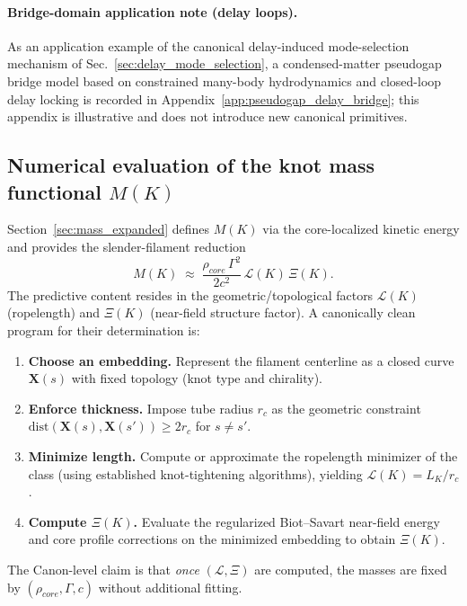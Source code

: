 \documentclass[10pt]{article}
\newcommand{\rhocore}{\rho_{core}}
\begin{document}
\paragraph{Bridge-domain application note (delay loops).}
As an application example of the canonical delay-induced mode-selection mechanism of Sec.~\ref{sec:delay_mode_selection},
a condensed-matter pseudogap bridge model based on constrained many-body hydrodynamics and closed-loop delay locking is recorded in Appendix~\ref{app:pseudogap_delay_bridge};
this appendix is illustrative and does not introduce new canonical primitives.

\subsection{Numerical evaluation of the knot mass functional $M(K)$}
\label{sec:mass_numerics_program}

Section~\ref{sec:mass_expanded} defines $M(K)$ via the core-localized kinetic energy
and provides the slender-filament reduction
\begin{equation}
M(K)\;\approx\;\frac{\rhocore\,\Gamma^2}{2c^2}\,\mathcal{L}(K)\,\Xi(K).
\end{equation}
The predictive content resides in the geometric/topological factors
$\mathcal{L}(K)$ (ropelength) and $\Xi(K)$ (near-field structure factor). A
canonically clean program for their determination is:

\begin{enumerate}
\item \textbf{Choose an embedding.} Represent the filament centerline as a closed curve
$\mathbf{X}(s)$ with fixed topology (knot type and chirality).
\item \textbf{Enforce thickness.} Impose tube radius $r_c$ as the geometric constraint
$\mathrm{dist}(\mathbf{X}(s),\mathbf{X}(s'))\ge 2r_c$ for $s\neq s'$.
\item \textbf{Minimize length.} Compute or approximate the ropelength minimizer of the class
(using established knot-tightening algorithms), yielding $\mathcal{L}(K)=L_K/r_c$.
\item \textbf{Compute $\Xi(K)$.} Evaluate the regularized Biot--Savart near-field energy and
core profile corrections on the minimized embedding to obtain $\Xi(K)$.
\end{enumerate}

The Canon-level claim is that \emph{once} $(\mathcal{L},\Xi)$ are computed, the masses
are fixed by $(\rhocore,\Gamma,c)$ without additional fitting.
\end{document}

